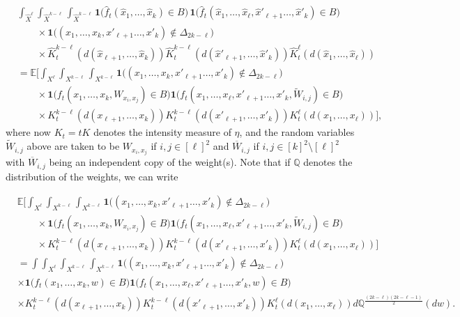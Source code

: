 \documentclass{article}
\theoremstyle{definition}
\numberwithin{equation}{section}
\theoremstyle{remark}
\begin{document}
\begin{align*}
  &  \int_{\hat{X}^\ell}  
\int_{\hat{X}^{k - \ell}}\int_{\hat{X}^{k - \ell}} 
\mathbf{1}\big( \hat{f}_t ( \hat{x}_1, \ldots, \hat{x}_k ) \in B \big) \,  \mathbf{1}\big( \hat{f}_t ( \hat{x}_1, \ldots, \hat{x}_\ell, \hat{x}'_{\ell+1} \ldots, \hat{x}'_{k} ) \in B \big) \\
& \qquad \times  \mathbf{1}\big(  ( {x}_1, \ldots, {x}_k, {x}'_{\ell+1} \ldots, {x}'_{k} ) \notin \Delta_{2k-\ell} \big) \\
& \qquad \times \hat{K}_t^{k - \ell}(d(\hat{x}_{\ell+1}, \ldots, \hat{x}_k)) \hat{K}_t^{k - \ell}(d(\hat{x}'_{\ell+1}, \ldots, \hat{x}'_k))\hat{K}_t^\ell(d(\hat{x}_1, \ldots, \hat{x}_\ell)) \\
& = \mathbb{E} \Bigg[ \int_{X^\ell}  
\int_{X^{k - \ell}}\int_{X^{k - \ell}} 
\mathbf{1}\big(  ( {x}_1, \ldots, {x}_k, {x}'_{\ell+1} \ldots, {x}'_{k} ) \notin \Delta_{2k-\ell} \big) \,  \\
& \qquad \times \mathbf{1}\big( {f}_t ( {x}_1, \ldots, {x}_k , W_{x_i,x_j} ) \in B \big)\mathbf{1}\big( {f}_t ( {x}_1, \ldots, {x}_\ell, {x}'_{\ell+1} \ldots, {x}'_{k}, \tilde{W}_{i,j} ) \in B \big) \\
& \qquad \times {K}_t^{k - \ell}(d({x}_{\ell+1}, \ldots, {x}_k)) {K}_t^{k - \ell}(d({x}'_{\ell+1}, \ldots, {x}'_k)) {K}_t^\ell(d({x}_1, \ldots, {x}_\ell)) \Bigg] ,
\end{align*}
where now $K_t = tK$ denotes the intensity measure of $\eta$, and the random variables $\tilde{W}_{i,j}$ above are taken to be ${W}_{x_i,x_j}$ if $i,j \in [\ell]^2$ and $\overline{W}_{i,j}$ if $i,j \in [k]^2 \setminus [\ell]^2$ with $\overline{W}_{i,j}$ being an independent copy of the weight(s). Note that if $\mathbb{Q}$ denotes the distribution of the weights, we can write

\begin{align*}
   & \mathbb{E} \Bigg[ \int_{X^\ell}  
\int_{X^{k - \ell}}\int_{X^{k - \ell}} 
\mathbf{1}\big(  ( {x}_1, \ldots, {x}_k, {x}'_{\ell+1} \ldots, {x}'_{k} ) \notin \Delta_{2k-\ell} \big) \,  \\
& \qquad \times \mathbf{1}\big( {f}_t ( {x}_1, \ldots, {x}_k , W_{x_i,x_j} ) \in B \big)\mathbf{1}\big( {f}_t ( {x}_1, \ldots, {x}_\ell, {x}'_{\ell+1} \ldots, {x}'_{k}, \tilde{W}_{i,j} ) \in B \big) \\
& \qquad \times {K}_t^{k - \ell}(d({x}_{\ell+1}, \ldots, {x}_k)) {K}_t^{k - \ell}(d({x}'_{\ell+1}, \ldots, {x}'_k)) {K}_t^\ell(d({x}_1, \ldots, {x}_\ell)) \Bigg] \\
& = \int \int_{X^\ell}  
\int_{X^{k - \ell}}\int_{X^{k - \ell}} 
\mathbf{1}\big(  ( {x}_1, \ldots, {x}_k, {x}'_{\ell+1} \ldots, {x}'_{k} ) \notin \Delta_{2k-\ell} \big) \,  \\
&  \times \mathbf{1}\big( {f}_t ( {x}_1, \ldots, {x}_k , w ) \in B \big)\mathbf{1}\big( {f}_t ( {x}_1, \ldots, {x}_\ell, {x}'_{\ell+1} \ldots, {x}'_{k}, w ) \in B \big) \\
&  \times {K}_t^{k - \ell}(d({x}_{\ell+1}, \ldots, {x}_k)) {K}_t^{k - \ell}(d({x}'_{\ell+1}, \ldots, {x}'_k)) {K}_t^\ell(d({x}_1, \ldots, {x}_\ell)) d\mathbb{Q}^{\frac{(2k - \ell) (2k -\ell-1)}{2}} (dw).
\end{align*}
\end{document}
